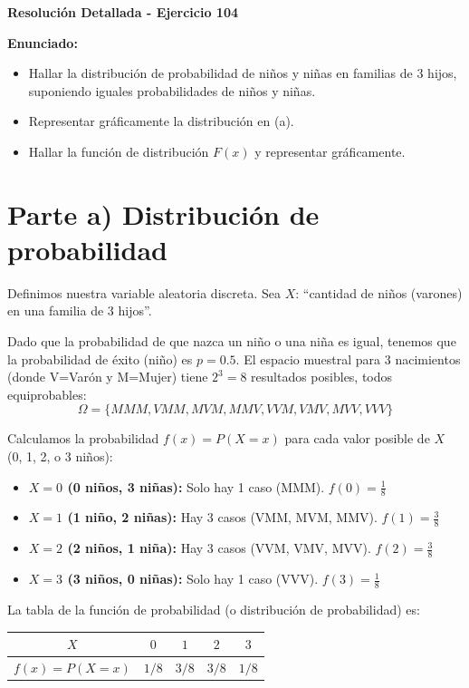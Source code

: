 \documentclass[11pt, a4paper]{article}
\begin{document}
\begin{center}
    \Large \textbf{Resolución Detallada - Ejercicio 104}
\end{center}

\vspace{0.5cm}

\textbf{Enunciado:}
\begin{itemize}
    \item[a.] Hallar la distribución de probabilidad de niños y niñas en familias de 3 hijos, suponiendo iguales probabilidades de niños y niñas.
    \item[b.] Representar gráficamente la distribución en (a).
    \item[c.] Hallar la función de distribución $F(x)$ y representar gráficamente.
\end{itemize}

\vspace{0.5cm}

\section*{Parte a) Distribución de probabilidad}

Definimos nuestra variable aleatoria discreta. Sea $X$: ``cantidad de niños (varones) en una familia de 3 hijos''. 

Dado que la probabilidad de que nazca un niño o una niña es igual, tenemos que la probabilidad de éxito (niño) es $p = 0.5$. El espacio muestral para 3 nacimientos (donde V=Varón y M=Mujer) tiene $2^3 = 8$ resultados posibles, todos equiprobables:
\[ \Omega = \{MMM, VMM, MVM, MMV, VVM, VMV, MVV, VVV\} \]

Calculamos la probabilidad $f(x) = P(X=x)$ para cada valor posible de $X$ (0, 1, 2, o 3 niños):
\begin{itemize}
    \item \textbf{$X=0$ (0 niños, 3 niñas):} Solo hay 1 caso (MMM). $f(0) = \frac{1}{8}$
    \item \textbf{$X=1$ (1 niño, 2 niñas):} Hay 3 casos (VMM, MVM, MMV). $f(1) = \frac{3}{8}$
    \item \textbf{$X=2$ (2 niños, 1 niña):} Hay 3 casos (VVM, VMV, MVV). $f(2) = \frac{3}{8}$
    \item \textbf{$X=3$ (3 niños, 0 niñas):} Solo hay 1 caso (VVV). $f(3) = \frac{1}{8}$
\end{itemize}

La tabla de la función de probabilidad (o distribución de probabilidad) es:
\begin{center}
\begin{tabular}{c c c c c}
\toprule
$X$ & $0$ & $1$ & $2$ & $3$ \\
\midrule
$f(x) = P(X=x)$ & $1/8$ & $3/8$ & $3/8$ & $1/8$ \\
\bottomrule
\end{tabular}
\end{center}
\end{document}
